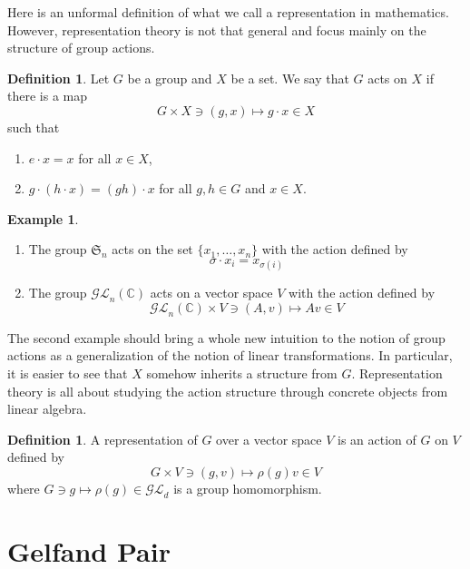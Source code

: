 \documentclass[12pt]{article}
\theoremstyle{definition}
\newtheorem{definition}[theorem]{Definition}
\newtheorem{example}[theorem]{Example}
\newcommand{\C}{\mathbb{C}}
\begin{document}
Here is an unformal definition of what we call a representation in mathematics. However, 
representation theory is not that general and focus mainly on the structure of group actions.
\begin{definition}
    Let \(G\) be a group and \(X\) be a set. We say that \(G\) acts on \(X\) if there is a map
    \[
        G \times X \ni (g,x) \mapsto g \cdot x\in X
    \]
    such that 
    \begin{enumerate}
        \item \(e \cdot x = x\) for all \(x \in X\),
        \item \(g \cdot (h \cdot x) = (gh) \cdot x\) for all \(g,h \in G\) and \(x \in X\).
    \end{enumerate}
\end{definition}
\begin{example}
    \begin{enumerate}
        \item The group \(\mathfrak{S}_n\) acts on the set \(\{x_1,\dots,x_n\}\) with the action defined by 
        \begin{equation*}
            \sigma \cdot x_i = x_{\sigma(i)}
        \end{equation*}
        \item The group \(\mathcal{GL}_n(\C)\) acts on a vector space \(V\) with the action defined by 
        \begin{equation*}
            \mathcal{GL}_n(\C)\times V\ni (A,v)\mapsto Av\in V
        \end{equation*}
    \end{enumerate}
\end{example}
The second example should bring a whole new intuition to the notion of group actions as a 
generalization of the notion of linear transformations. In particular, it is easier to see that 
\(X\) somehow inherits a structure from \(G\). Representation theory is all about studying 
the action structure through concrete objects from linear algebra.
\begin{definition}
    A representation of \(G\) over a vector space \(V\) is an action of \(G\) on \(V\) defined by 
    \begin{equation}
        G \times V \ni (g,v) \mapsto \rho(g)v \in V
    \end{equation}
    where \(G\ni g \mapsto \rho(g)\in \mathcal{GL}_d\) is a group homomorphism.
\end{definition}
\section{Gelfand Pair}
\end{document}
